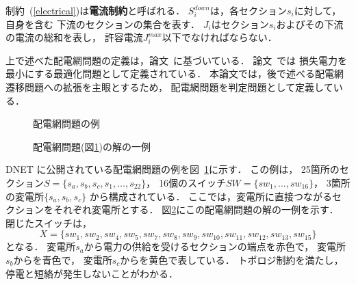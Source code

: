 制約~(\ref{electrical})は\textbf{電流制約}と呼ばれる．
$S_{i}^{down}$は，各セクション$s_{i}$に対して，自身を含む
下流のセクションの集合を表す．
$J_{i}$はセクション$s_{i}$およびその下流の電流の総和を表し，
許容電流$J_{i}^{max}$以下でなければならない．

上で述べた配電網問題の定義は，論文~\cite{Minato:dnet:ZDD}に基づいている．
論文~\cite{Minato:dnet:ZDD}では
損失電力を最小にする最適化問題として定義されている．
本論文では，後で述べる配電網遷移問題への拡張を主眼とするため，
配電網問題を判定問題として定義している．

\begin{figure}[tb]
 \centering
 \scalebox{0.6}{}
  \caption{配電網問題の例}
  \label{fig:test-input}
\end{figure}
%  
\begin{figure}[tb]
 \centering
 \scalebox{0.6}{}
 \caption{配電網問題(図\ref{fig:test-input})の解の一例}
 \label{fig:test-output}
\end{figure}

DNET
に公開されている配電網問題の例を図~\ref{fig:test-input}に示す．
この例は，
25箇所のセクション$S=\{s_{a},s_{b},s_{c},s_{1},\ldots, s_{22}\}$，
16個のスイッチ$SW=\{sw_{1},\ldots, sw_{16}\}$，
3箇所の変電所$\{s_{a}, s_{b}, s_{c}\}$
から構成されている．
ここでは，変電所に直接つながるセクションをそれぞれ変電所とする．
%
図\ref{fig:test-output}にこの配電網問題の解の一例を示す．
閉じたスイッチは，
\[X=\{sw_{1},sw_{2},sw_{4},sw_{5},sw_{7},sw_{8},sw_{9},%
sw_{10},sw_{11},sw_{12},sw_{13},sw_{15}\}\]
となる．
変電所$s_{a}$から電力の供給を受けるセクションの端点を赤色で，
変電所$s_{b}$からを青色で，
変電所$s_{c}$からを黄色で表している．
トポロジ制約を満たし，停電と短絡が発生しないことがわかる．


